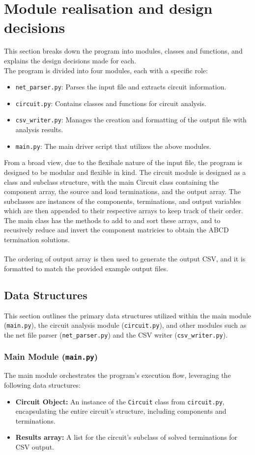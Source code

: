\documentclass[conference]{IEEEtran}
\begin{document}
\section{Module realisation and design decisions}
This section breaks down the program into modules, classes and functions, and explains the design decisions made for each.\\
The program is divided into four modules, each with a specific role:
\begin{itemize}
    \item \texttt{net\_parser.py}: Parses the input file and extracts circuit information.
    \item \texttt{circuit.py}: Contains classes and functions for circuit analysis.
    \item \texttt{csv\_writer.py}: Manages the creation and formatting of the output file with analysis results.
    \item \texttt{main.py}: The main driver script that utilizes the above modules.
\end{itemize}

From a broad view, due to the flexibale nature of the input file, the program is designed to be modular and flexible in kind. The circuit module is
designed as a class and subclass structure, with the main Circuit class containing the component array, the source and load terminations, and the output array.
The subclasses are instances of the components, terminations, and output variables which are then appended to their respective arrays to keep track of their order.
The main class has the methods to add to and sort these arrays, and to recusively reduce and invert the component matricies to obtain the ABCD termination solutions.
\\\\
The ordering of output array is then used to generate the output CSV, and it is formatted to match the provided example output files. 

\subsection{Data Structures}
This section outlines the primary data structures utilized within the main module (\texttt{main.py}), the circuit analysis module (\texttt{circuit.py}), and other modules such as the net file parser (\texttt{net\_parser.py}) and the CSV writer (\texttt{csv\_writer.py}).

\subsubsection*{Main Module (\texttt{main.py})}
The main module orchestrates the program's execution flow, leveraging the following data structures:
\begin{itemize}
    \item \textbf{Circuit Object:} An instance of the \texttt{Circuit} class from \texttt{circuit.py}, encapsulating the entire circuit's structure, including components and terminations.
    \item \textbf{Results array:} A list for the circuit's subclass of solved terminations for CSV output. 
\end{itemize}
\end{document}
